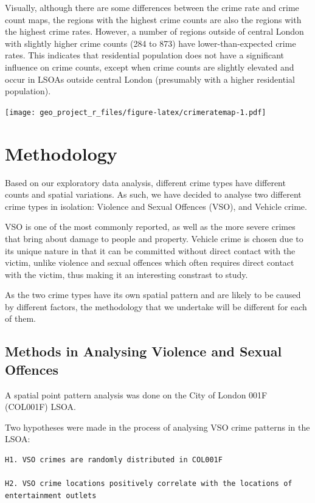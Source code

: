\documentclass[]{article}
\theoremstyle{definition}
\theoremstyle{definition}
\theoremstyle{definition}
\theoremstyle{remark}
\begin{document}
Visually, although there are some differences between the crime rate and
crime count maps, the regions with the highest crime counts are also the
regions with the highest crime rates. However, a number of regions
outside of central London with slightly higher crime counts (284 to 873)
have lower-than-expected crime rates. This indicates that residential
population does not have a significant influence on crime counts, except
when crime counts are slightly elevated and occur in LSOAs outside
central London (presumably with a higher residential population).

\texttt{[image: geo\_project\_r\_files/figure-latex/crimeratemap-1.pdf]}
\pagebreak

\section{Methodology}\label{methodology}

Based on our exploratory data analysis, different crime types have
different counts and spatial variations. As such, we have decided to
analyse two different crime types in isolation: Violence and Sexual
Offences (VSO), and Vehicle crime.

VSO is one of the most commonly reported, as well as the more severe
crimes that bring about damage to people and property. Vehicle crime is
chosen due to its unique nature in that it can be committed without
direct contact with the victim, unlike violence and sexual offences
which often requires direct contact with the victim, thus making it an
interesting constrast to study.

As the two crime types have its own spatial pattern and are likely to be
caused by different factors, the methodology that we undertake will be
different for each of them.

\subsection{Methods in Analysing Violence and Sexual
Offences}\label{methods-in-analysing-violence-and-sexual-offences}

A spatial point pattern analysis was done on the City of London 001F
(COL001F) LSOA.

Two hypotheses were made in the process of analysing VSO crime patterns
in the LSOA:

\begin{verbatim}
H1. VSO crimes are randomly distributed in COL001F 

H2. VSO crime locations positively correlate with the locations of entertainment outlets
\end{verbatim}
\end{document}
